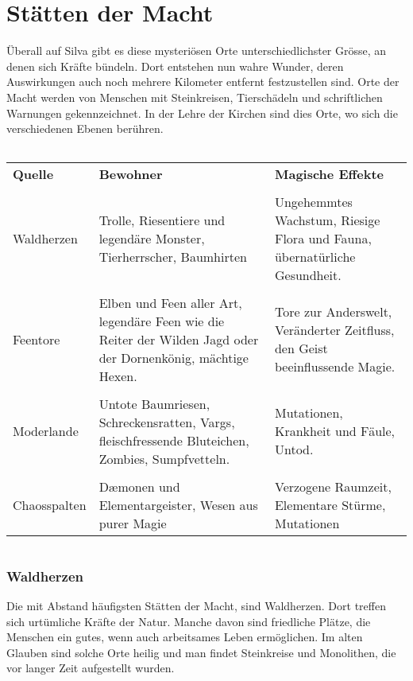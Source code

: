 \documentclass[12pt,twoside,twocolumn,openany]{book}
\begin{document}
\section{Stätten der Macht}
Überall auf Silva gibt es diese mysteriösen Orte unterschiedlichster Grösse, an denen sich Kräfte bündeln. Dort entstehen nun wahre Wunder, deren Auswirkungen auch noch mehrere Kilometer entfernt festzustellen sind. Orte der Macht werden von Menschen mit Steinkreisen, Tierschädeln und schriftlichen Warnungen gekennzeichnet. In der Lehre der Kirchen sind dies Orte, wo sich die verschiedenen Ebenen berühren.
\begin{table*}
	\begin{tabular}{l}
	\hline
	\end{tabular}
	\begin{tabularx}{\textwidth}{lXX}
		\textbf{Quelle} & \textbf{Bewohner} & \textbf{Magische Effekte}\\
		&&\\
		Waldherzen & Trolle, Riesentiere und legendäre Monster, Tierherrscher, Baumhirten &Ungehemmtes Wachstum, Riesige Flora und Fauna, übernatürliche Gesundheit.\\
		&&\\
		Feentore & Elben und Feen aller Art, legendäre Feen wie die Reiter der Wilden Jagd oder der Dornenkönig, mächtige Hexen. & Tore zur Anderswelt, Veränderter Zeitfluss, den Geist beeinflussende Magie.\\
		&&\\
		Moderlande & Untote Baumriesen, Schreckensratten, Vargs, fleischfressende Bluteichen, Zombies, Sumpfvetteln. &Mutationen, Krankheit und Fäule, Untod.\\
		&&\\
		Chaosspalten & D\ae monen und Elementargeister, Wesen aus purer Magie & Verzogene Raumzeit, Elementare Stürme, Mutationen \\
	\end{tabularx}
	\begin{tabular}{l}
	\hline
	\end{tabular}
\end{table*}

\subsubsection{Waldherzen}
Die mit Abstand häufigsten Stätten der Macht, sind Waldherzen. Dort treffen sich urtümliche Kräfte der Natur. Manche davon sind friedliche Plätze, die Menschen ein gutes, wenn auch arbeitsames Leben ermöglichen. Im alten Glauben sind solche Orte heilig und man findet Steinkreise und Monolithen, die vor langer Zeit aufgestellt wurden. 
\end{document}
